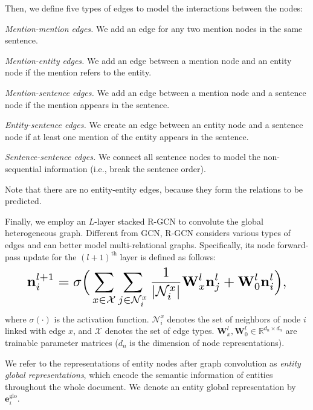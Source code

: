 \documentclass[11pt,a4paper]{article}
\begin{document}
Then, we define five types of edges to model the interactions between the nodes:
\begin{compactitem}
\item \emph{Mention-mention edges.} We add an edge for any two mention nodes in the same sentence.

\item \emph{Mention-entity edges.} We add an edge between a mention node and an entity node if the mention refers to the entity.

\item \emph{Mention-sentence edges.} We add an edge between a mention node and a sentence node if the mention appears in the sentence.

\item \emph{Entity-sentence edges.} We create an edge between an entity node and a sentence node if at least one mention of the entity appears in the sentence.

\item \emph{Sentence-sentence edges.} We connect all sentence nodes to model the non-sequential information (i.e., break the sentence order).
\end{compactitem}

Note that there are no entity-entity edges, because they form the relations to be predicted.

Finally, we employ an $L$-layer stacked R-GCN \cite{schlichtkrull2018modeling} to convolute the global heterogeneous graph. Different from GCN, R-GCN considers various types of edges and can better model multi-relational graphs. Specifically, its node forward-pass update for the $(l+1)^\textrm{th}$ layer is defined as follows:
\begin{align}
\resizebox{.89\columnwidth}{!}{$\begin{aligned}
\mathbf{n}^{l+1}_i = \sigma\Big( \sum_{x \in\mathcal{X}} \sum_{j \in\mathcal{N}^x_i} \frac{1}{|\mathcal{N}_i^x|} \mathbf{W}^l_x\mathbf{n}^l_j + \mathbf{W}^l_0\mathbf{n}^l_i \Big),
\end{aligned}$}
\end{align} 
where $\sigma(\cdot)$ is the activation function. $\mathcal{N}^x_i$ denotes the set of neighbors of node $i$ linked with edge $x$, and $\mathcal{X}$ denotes the set of edge types. $ \mathbf{W}^l_x,\mathbf{W}^l_0\in\mathbb{R}^{d_n \times d_n}$ are trainable parameter matrices ($d_n$ is the dimension of node representations).

We refer to the representations of entity nodes after graph convolution as \emph{entity global representations}, which encode the semantic information of entities throughout the whole document. We denote an entity global representation by $\mathbf{e}_i^\textrm{glo}$.
\end{document}
